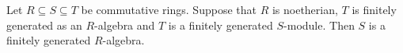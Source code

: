 Let $R \subseteq S \subseteq T$ be commutative rings. Suppose that $R$ is
noetherian, $T$ is finitely generated as an $R$-algebra and $T$ is a finitely
generated $S$-module. Then $S$ is a finitely generated $R$-algebra.
